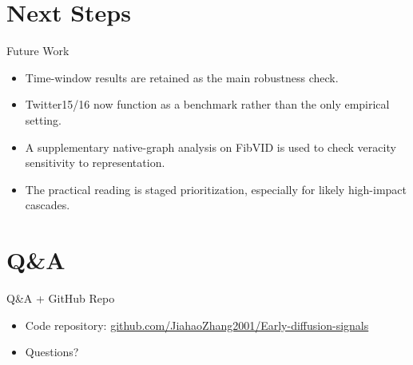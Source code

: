 \documentclass{beamer}
\begin{document}
\section{Next Steps}
\begin{frame}{Future Work}
\begin{itemize}
\item Time-window results are retained as the main robustness check.
\item Twitter15/16 now function as a benchmark rather than the only empirical setting.
\item A supplementary native-graph analysis on FibVID is used to check veracity sensitivity to representation.
\item The practical reading is staged prioritization, especially for likely high-impact cascades.
\end{itemize}
\end{frame}

\section{Q\&A}
\begin{frame}{Q\&A + GitHub Repo}
\begin{itemize}
\item Code repository: \href{https://github.com/JiahaoZhang2001/Early-diffusion-signals}{github.com/JiahaoZhang2001/Early-diffusion-signals}
\item Questions?
\end{itemize}
\end{frame}
\end{document}
